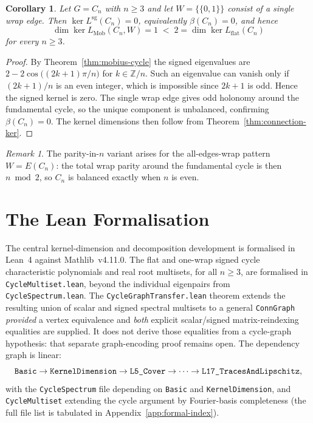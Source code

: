 \documentclass[11pt,a4paper]{amsart}
\theoremstyle{plain}
\newtheorem{corollary}[theorem]{Corollary}
\theoremstyle{definition}
\theoremstyle{remark}
\newtheorem{remark}[theorem]{Remark}
\DeclareMathOperator{\Ker}{ker}
\newcommand{\ZZ}{\mathbb{Z}}
\newcommand{\Lsigned}{L^{\operatorname{sg}}}
\begin{document}
\begin{corollary}
Let $G=C_n$ with $n\ge 3$ and let $W=\{\{0,1\}\}$ consist of a single wrap
edge. Then $\Ker\Lsigned(C_n)=0$, equivalently $\beta(C_n)=0$, and hence
\[
  \dim\Ker L_{\operatorname{Mob}}(C_n,W) = 1
  \;<\; 2 = \dim\Ker L_{\operatorname{flat}}(C_n)
\]
for every $n\ge 3$.
\end{corollary}

\begin{proof}
By Theorem~\ref{thm:mobius-cycle} the signed eigenvalues are
$2-2\cos\bigl((2k+1)\pi/n\bigr)$ for $k\in\ZZ/n$. Such an eigenvalue can
vanish only if $(2k+1)/n$ is an even integer, which is impossible since
$2k+1$ is odd. Hence the signed kernel is zero. The single wrap edge gives
odd holonomy around the fundamental cycle, so the unique component is
unbalanced, confirming $\beta(C_n)=0$. The kernel dimensions then follow from
Theorem~\ref{thm:connection-ker}.
\end{proof}

\begin{remark}
The parity-in-$n$ variant arises for the all-edges-wrap pattern
$W=E(C_n)$: the total wrap parity around the fundamental cycle is then
$n\bmod 2$, so $C_n$ is balanced exactly when $n$ is even.
\end{remark}

\section{The Lean Formalisation}\label{sec:formalisation}

The central kernel-dimension and decomposition development is formalised
in Lean~4 against Mathlib~v4.11.0. The flat and one-wrap signed cycle
characteristic polynomials and real root multisets, for all $n\ge3$,
are formalised in \texttt{CycleMultiset.lean}, beyond the individual
eigenpairs from \texttt{CycleSpectrum.lean}.
The \texttt{CycleGraphTransfer.lean} theorem
 extends
the resulting union of scalar and signed spectral multisets to a
general \texttt{ConnGraph} \emph{provided} a vertex equivalence and
\emph{both} explicit scalar/signed matrix-reindexing equalities are
supplied. It does not derive those equalities from a cycle-graph
hypothesis: that separate graph-encoding proof remains open.
The dependency graph is linear:
\[
  \text{\texttt{Basic}} \to
  \text{\texttt{KernelDimension}} \to
  \text{\texttt{L5\_Cover}} \to \cdots \to
  \text{\texttt{L17\_TracesAndLipschitz}},
\]
with the \texttt{CycleSpectrum} file depending on \texttt{Basic}
and \texttt{KernelDimension}, and \texttt{CycleMultiset} extending
the cycle argument by Fourier-basis completeness (the full file list
is tabulated in Appendix~\ref{app:formal-index}).
\end{document}
